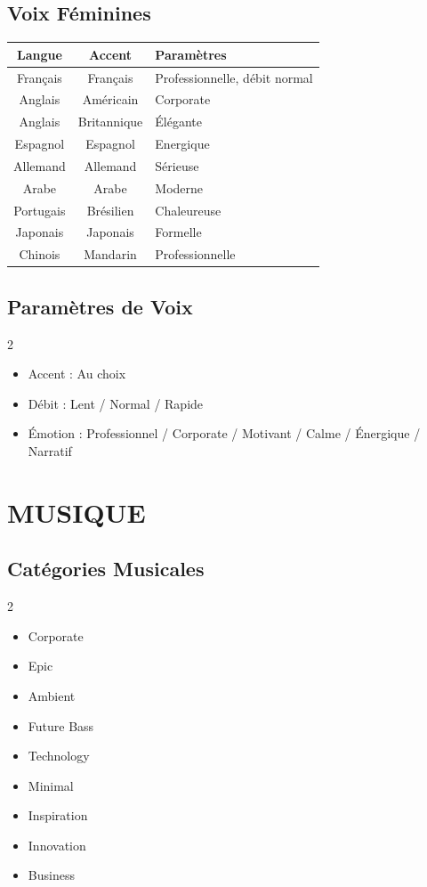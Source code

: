 \documentclass[12pt,a4paper,oneside]{book}
\begin{document}
\section{Voix Féminines}
\begin{center}
\begin{tabular}{|c|c|p{6cm}|}
\hline
\rowcolor{violetIA}
\color{white}\textbf{Langue} & \color{white}\textbf{Accent} & \color{white}\textbf{Paramètres} \\
\hline
Français & Français & Professionnelle, débit normal \\
\hline
Anglais & Américain & Corporate \\
\hline
Anglais & Britannique & Élégante \\
\hline
Espagnol & Espagnol & Energique \\
\hline
Allemand & Allemand & Sérieuse \\
\hline
Arabe & Arabe & Moderne \\
\hline
Portugais & Brésilien & Chaleureuse \\
\hline
Japonais & Japonais & Formelle \\
\hline
Chinois & Mandarin & Professionnelle \\
\hline
\end{tabular}
\end{center}

\section{Paramètres de Voix}
\begin{multicols}{2}
\begin{itemize}
\item Accent : Au choix
\item Débit : Lent / Normal / Rapide
\item Émotion : Professionnel / Corporate / Motivant / Calme / Énergique / Narratif
\end{itemize}
\end{multicols}

\chapter{MUSIQUE}

\section{Catégories Musicales}
\begin{multicols}{2}
\begin{itemize}
\item Corporate
\item Epic
\item Ambient
\item Future Bass
\item Technology
\item Minimal
\item Inspiration
\item Innovation
\item Business
\end{itemize}
\end{multicols}
\end{document}
